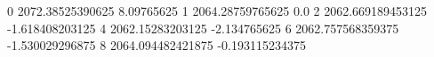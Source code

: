 0 2072.38525390625 8.09765625
1 2064.28759765625 0.0
2 2062.669189453125 -1.618408203125
4 2062.15283203125 -2.134765625
6 2062.757568359375 -1.530029296875
8 2064.094482421875 -0.193115234375
